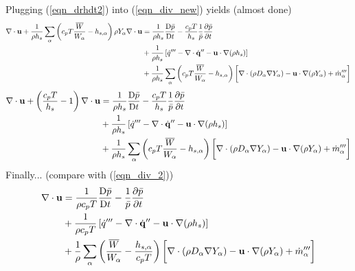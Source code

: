 Plugging (\ref{eqn_drhdt2}) into (\ref{eqn_div_new}) yields (almost done)
\begin{align}
\label{eqn_div_4}
\nabla\cdot \mathbf{u} + \frac{1}{\rho h_s} \sum_\alpha \left(c_p T\frac{\overline{W}}{W_\alpha} - h_{s,\alpha} \right) \rho Y_\alpha \nabla\cdot \mathbf{u}  &= \frac{1}{\rho h_s}\frac{\mbox{D} \bar{p}}{\mbox{D} t} - \frac{c_p T}{h_s}\frac{1}{\bar{p}} \frac{\partial \bar{p}}{\partial t} \notag\\
&+ \frac{1}{\rho h_s}\left[ \dot{q}^{\prime\prime\prime} - \nabla\cdot \dot{\mathbf{q}}^{\prime\prime} - \mathbf{u} \cdot\nabla (\rho h_s) \right] \notag\\
&+ \frac{1}{\rho h_s} \sum_\alpha \left(c_p T\frac{\overline{W}}{W_\alpha} - h_{s,\alpha} \right) \bigg[ \nabla\cdot (\rho D_\alpha \nabla Y_\alpha) - \mathbf{u} \cdot \nabla (\rho Y_\alpha) + \dot{m}_\alpha^{\prime\prime\prime}\bigg]
\end{align}
\begin{align}
\label{eqn_div_5}
\nabla\cdot \mathbf{u} + \left(\frac{c_p T}{h_s} - 1\right)\nabla\cdot \mathbf{u}  &= \frac{1}{\rho h_s}\frac{\mbox{D} \bar{p}}{\mbox{D} t} - \frac{c_p T}{h_s}\frac{1}{\bar{p}} \frac{\partial \bar{p}}{\partial t} \notag\\
&+ \frac{1}{\rho h_s}\left[ \dot{q}^{\prime\prime\prime} - \nabla\cdot \dot{\mathbf{q}}^{\prime\prime} - \mathbf{u} \cdot\nabla (\rho h_s) \right] \notag\\
&+ \frac{1}{\rho h_s} \sum_\alpha \left(c_p T\frac{\overline{W}}{W_\alpha} - h_{s,\alpha} \right) \bigg[ \nabla\cdot (\rho D_\alpha \nabla Y_\alpha) - \mathbf{u} \cdot \nabla (\rho Y_\alpha) + \dot{m}_\alpha^{\prime\prime\prime} \bigg]
\end{align}
Finally... (compare with (\ref{eqn_div_2}))
\begin{align}
\label{eqn_div_6}
\nabla\cdot \mathbf{u} &= \frac{1}{\rho c_p T}\frac{\mbox{D} \bar{p}}{\mbox{D} t} - \frac{1}{\bar{p}} \frac{\partial \bar{p}}{\partial t} \notag\\
&+ \frac{1}{\rho c_p T}\left[ \dot{q}^{\prime\prime\prime} - \nabla\cdot \dot{\mathbf{q}}^{\prime\prime} - \mathbf{u} \cdot\nabla (\rho h_s) \right] \notag\\
&+ \frac{1}{\rho} \sum_\alpha \left(\frac{\overline{W}}{W_\alpha} - \frac{h_{s,\alpha}}{c_p T} \right) \bigg[ \nabla\cdot (\rho D_\alpha \nabla Y_\alpha) - \mathbf{u} \cdot \nabla (\rho Y_\alpha) + \dot{m}_\alpha^{\prime\prime\prime} \bigg]
\end{align}

